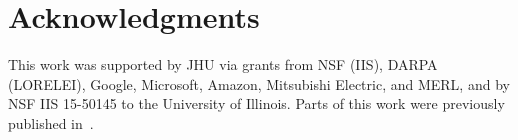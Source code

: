 \section{Acknowledgments}
This work was
supported by JHU via grants from NSF (IIS), DARPA (LORELEI),
Google, Microsoft, Amazon, Mitsubishi Electric, and MERL, and by NSF
IIS 15-50145 to the University of Illinois.  Parts of
this work were previously published in~\cite{Liu15}.
